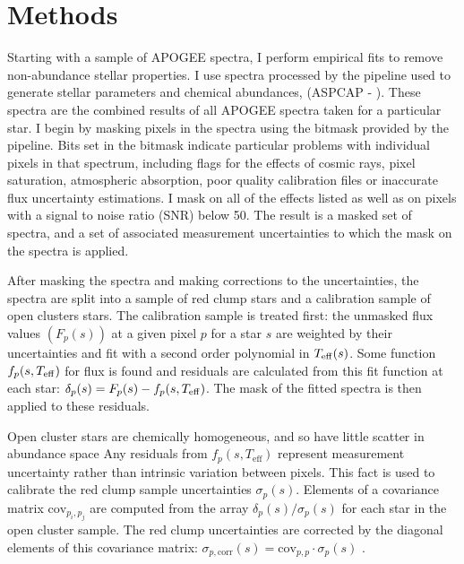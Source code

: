 \documentclass[preprint]{aastex}
\begin{document}
\section{Methods}
\label{sec:methods}

 
Starting with a sample of APOGEE spectra, I perform empirical fits to remove non-abundance stellar properties. I use spectra processed by the pipeline used to generate stellar parameters and chemical abundances, (ASPCAP - \citealt{ASPCAP}). These spectra are the combined results of all APOGEE spectra taken for a particular star. I begin by masking pixels in the spectra using the bitmask provided by the pipeline. Bits set in the bitmask indicate particular problems with individual pixels in that spectrum, including flags for the effects of cosmic rays, pixel saturation, atmospheric absorption, poor quality calibration files or inaccurate flux uncertainty estimations. I mask on all of the effects listed as well as on pixels with a signal to noise ratio (SNR) below 50.  The result is a masked set of spectra, and a set of associated measurement uncertainties to which the mask on the spectra is applied.

After masking the spectra and making corrections to the uncertainties,  the spectra are split into a sample of red clump stars and a calibration sample of open clusters stars. The calibration sample is treated first: the unmasked flux values $(F_p(s))$ at a given pixel $p$  for a star $s$  are weighted by their uncertainties and fit with a second order polynomial in $T_{\rm eff}(s)$. Some function $f_p(s,T_{\rm eff})$ for flux is found  and residuals are calculated from this fit function at each star: $\delta_{p}(s) = F_p(s) - f_p(s,T_{\rm eff})$. The mask of the fitted spectra is then applied to these residuals.

Open cluster stars are chemically homogeneous, and so have little scatter in abundance space \citep{openclusters} Any residuals from $f_p(s,T_{\mathrm{eff}})$ represent measurement uncertainty rather than intrinsic variation between pixels. This fact is used to calibrate the red clump sample uncertainties $\sigma_p(s)$. Elements of a covariance matrix $\mathrm{cov}_{p_i,p_j}$ are computed from the array $\delta_p(s)/\sigma_p(s)$ for each star in the open cluster sample. The red clump uncertainties are corrected by the diagonal elements of this covariance matrix: $\sigma_{p,\mathrm{corr}}(s) = \mathrm{cov}_{p,p}\cdot\sigma_{p}(s)$ .  
\end{document}
